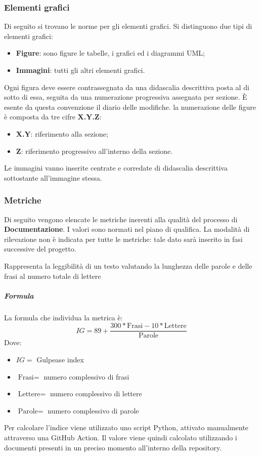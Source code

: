 	    \subsubsection{Elementi grafici}
	    Di seguito si trovano le norme per gli elementi grafici. Si distinguono due tipi di elementi grafici:
	    \begin{itemize}
	        \item \textbf{Figure}: sono figure le tabelle, i grafici ed i diagrammi UML;
	        \item \textbf{Immagini}: tutti gli altri elementi grafici. 
	    \end{itemize}
	    
	    Ogni figura deve essere contrassegnata da una didascalia descrittiva posta al di sotto di essa, seguita da una numerazione progressiva assegnata per sezione. È esente da questa convenzione il diario delle modifiche.
	    la numerazione delle figure è composta da tre cifre \textbf{X.Y.Z}:
	    \begin{itemize}
	        \item \textbf{X.Y}: riferimento alla sezione;
	        \item \textbf{Z}: riferimento progressivo all'interno della sezione.
	    \end{itemize}
	    
	    Le immagini vanno inserite centrate e corredate di didascalia descrittiva sottostante all'immagine stessa.
	    
	    \subsubsection{Metriche}
		Di seguito vengono elencate le metriche inerenti alla qualità del processo di \textbf{Documentazione}. I valori sono normati nel piano di qualifica. La modalità di rilevazione non è indicata per tutte le metriche: tale dato sarà inserito in fasi successive del progetto.
	    
        Rappresenta la leggibilità di un testo valutando la lunghezza delle parole e delle frasi al numero totale di lettere
        \subparagraph{Formula}
        La formula che individua la metrica è:
        \begin{displaymath}
        \textit{IG} = 89 + \frac{300 * \textrm{Frasi} - 10* \textrm{Lettere}}{\textrm{Parole}}
        \end{displaymath}
        Dove:
        \begin{itemize}
        \item[] $IG =$ Gulpease index
        \item[] $\textrm{Frasi} =$ numero complessivo di frasi
        \item[] $\textrm{Lettere} =$ numero complessivo di lettere
        \item[] $\textrm{Parole} =$ numero complessivo di parole
        \end{itemize}
        Per calcolare l'indice viene utilizzato uno script Python, attivato manualmente attraverso una GitHub Action. Il valore viene quindi calcolato utilizzando i documenti presenti in un preciso momento all'interno della repository.
        
